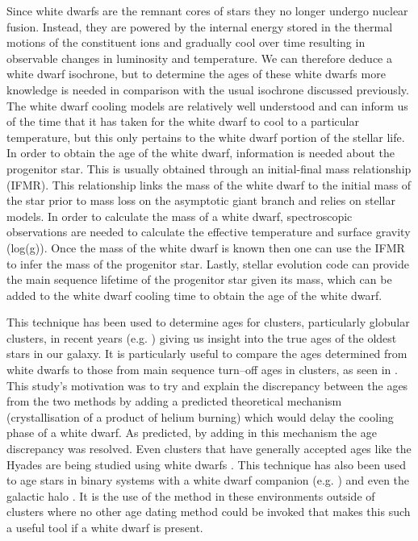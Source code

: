 Since white dwarfs are the remnant cores of stars they no longer undergo nuclear fusion. Instead, they are powered by the internal energy stored in the thermal motions of the constituent ions and gradually cool over time \citep{Mestel_1952} resulting in observable changes in luminosity and temperature. We can therefore deduce a white dwarf isochrone, but to determine the ages of these white dwarfs more knowledge is needed in comparison with the usual isochrone discussed previously. The white dwarf cooling models are relatively well understood and can inform us of the time that it has taken for the white dwarf to cool to a particular temperature, but this only pertains to the white dwarf portion of the stellar life. In order to obtain the age of the white dwarf, information is needed about the progenitor star. This is usually obtained through an initial-final mass relationship (IFMR). This relationship links the mass of the white dwarf to the initial mass of the star prior to mass loss on the asymptotic giant branch and relies on stellar models. In order to calculate the mass of a white dwarf, spectroscopic observations are needed to calculate the effective temperature and surface gravity (log(g)). Once the mass of the white dwarf is known then one can use the IFMR to infer the mass of the progenitor star. Lastly, stellar evolution code can provide the main sequence lifetime of the progenitor star given its mass, which can be added to the white dwarf cooling time to obtain the age of the white dwarf.

This technique has been used to determine ages for clusters, particularly globular clusters, in recent years (e.g. \citealt{Torres_etal_2015}) giving us insight into the true ages of the oldest stars in our galaxy. It is particularly useful to compare the ages determined from white dwarfs to those from main sequence turn--off ages in clusters, as seen in \citet{Garcia-Berro_etal_2010}. This study's motivation was to try and explain the discrepancy between the ages from the two methods by adding a predicted theoretical mechanism (crystallisation of a product of helium burning) which would delay the cooling phase of a white dwarf. As predicted, by adding in this mechanism the age discrepancy was resolved. Even clusters that have generally accepted ages like the Hyades are being studied using white dwarfs \citep{Salaris_Bedin_2018}. This technique has also been used to age stars in binary systems with a white dwarf companion (e.g. \citealt{Liebert_etal_2013}) and even the galactic halo \citep{Kilic_etal_2019}. It is the use of the method in these environments outside of clusters where no other age dating method could be invoked that makes this such a useful tool if a white dwarf is present.

